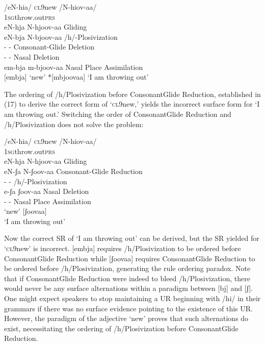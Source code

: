 \documentclass[output=paper]{langsci/langscibook}
\begin{document}
\ea{}
 /eN-hia/  \textsc{cl9}new  /N-hiov-aa/\\
  \textsc{1sg}throw.out\textsc{prs}\\
eN-hja      N-hjoov-aa        Gliding\\
eN-bja      N-bjoov-aa        /h/-Plosivization\\
{}-        {}-          Consonant-Glide Deletion\\
{}-        {}-          Nasal Deletion\\
em-bja      m-bjoov-aa        Nasal Place Assimilation\\{}
[embja]  ‘new’    *[mbjoovaa]  ‘I am throwing out’\\
\z

The ordering of /h/Plosivization before ConsonantGlide Reduction, established in (17) to derive the correct form of ‘\textsc{cl}9new,’ yields the incorrect surface form for ‘\textsc{I} am throwing out.’ Switching the order of ConsonantGlide Reduction and /h/Plosivization does not solve the problem:


\ea{}
 /eN-hia/  \textsc{cl9}new  /N-hiov-aa/ \\
 \textsc{1sg}throw.out\textsc{prs}\\
eN-hja      N-hjoov-aa        Gliding\\
eN-ʃa        N-ʃoov-aa        Consonant-Glide Reduction\\
{}-        {}-          /h/-Plosivization\\
e-ʃa        ʃoov-aa        Nasal Deletion{\rmfnm}\\
{}-        {}-          Nasal Place Assimilation\\
\*[eʃa]    ‘new’    [ʃoovaa]  \\
\glt ‘I am throwing out’
\z

Now the correct SR of ‘I am throwing out’ can be derived, but the SR yielded for ‘\textsc{cl}9new’ is incorrect. [embja] requires /h/Plosivization to be ordered before ConsonantGlide Reduction while [ʃoovaa] requires ConsonantGlide Reduction to be ordered before /h/Plosivization, generating the rule ordering paradox. Note that if ConsonantGlide Reduction were indeed to bleed /h/Plosivization, there would never be any surface alternations within a paradigm between [bj] and [ʃ]. One might expect speakers to stop maintaining a UR beginning with /hi/ in their grammars if there was no surface evidence pointing to the existence of this UR. However, the paradigm of the adjective ‘new’ proves that such alternations do exist, necessitating the ordering of /h/Plosivization before ConsonantGlide Reduction. 
\end{document}
